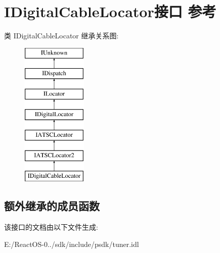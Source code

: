 \hypertarget{interface_i_digital_cable_locator}{}\section{I\+Digital\+Cable\+Locator接口 参考}
\label{interface_i_digital_cable_locator}
类 I\+Digital\+Cable\+Locator 继承关系图\+:\begin{figure}[H]
\begin{center}
\leavevmode
\includegraphics[height=7.000000cm]{interface_i_digital_cable_locator}
\end{center}
\end{figure}
\subsection*{额外继承的成员函数}


该接口的文档由以下文件生成\+:\begin{DoxyCompactItemize}
\item 
E\+:/\+React\+O\+S-\/0../sdk/include/psdk/tuner.\+idl\end{DoxyCompactItemize}

